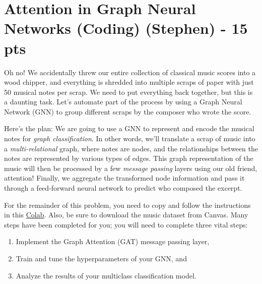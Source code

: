 \documentclass{exam}
\begin{document}
\newpage

\section{Attention in Graph Neural Networks (Coding) (Stephen) - 15 pts}

Oh no! We accidentally threw our entire collection of classical music scores into a wood chipper, and everything is shredded into multiple scraps of paper with just 50 musical notes per scrap. We need to put everything back together, but this is a daunting task. Let's automate part of the process by using a Graph Neural Network (GNN) to group different scraps by the composer who wrote the score.

Here's the plan: We are going to use a GNN to represent and encode the musical notes for \textit{graph classification}. In other words, we'll translate a scrap of music into a \textit{multi-relational} graph, where notes are nodes, and the relationships between the notes are represented by various types of edges. This graph representation of the music will then be processed by a few \textit{message passing} layers using our old friend, attention! Finally, we aggregate the transformed node information and pass it through a feed-forward neural network to predict who composed the excerpt.

For the remainder of this problem, you need to copy and follow the instructions in this \href{https://colab.research.google.com/drive/13av5NiX-q5k1xP9d-WDOvhGnkfvyiel7?usp=sharing}{Colab}. Also, be sure to download the music dataset from Canvas. Many steps have been completed for you; you will need to complete three vital steps:

\begin{enumerate}
    \item Implement the Graph Attention (GAT) message passing layer, 
    \item Train and tune the hyperparameters of your GNN, and
    \item Analyze the results of your multiclass classification model.
\end{enumerate}
\end{document}
